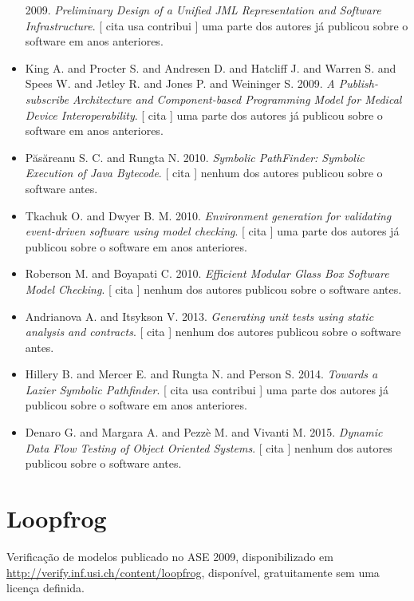 \begin{itemize}
      2009.
        \textit{ Preliminary Design of a Unified JML Representation and Software Infrastructure}.
      [
          cita
          usa
          contribui
      ]
uma parte dos autores já publicou sobre o software em anos anteriores.
\item King A. and Procter S. and Andresen D. and Hatcliff J. and Warren S. and Spees W. and Jetley R. and Jones P. and Weininger S.
      2009.
        \textit{ A Publish-subscribe Architecture and Component-based Programming Model for Medical Device Interoperability}.
      [
          cita
      ]
uma parte dos autores já publicou sobre o software em anos anteriores.
\item P\u{a}s\u{a}reanu S. C. and Rungta N.
      2010.
        \textit{ Symbolic PathFinder: Symbolic Execution of Java Bytecode}.
      [
          cita
      ]
nenhum dos autores publicou sobre o software antes.
\item Tkachuk O. and Dwyer B. M.
      2010.
        \textit{ Environment generation for validating event-driven software using model checking}.
      [
          cita
      ]
uma parte dos autores já publicou sobre o software em anos anteriores.
\item Roberson M. and Boyapati C.
      2010.
        \textit{ Efficient Modular Glass Box Software Model Checking}.
      [
          cita
      ]
nenhum dos autores publicou sobre o software antes.
\item Andrianova A. and Itsykson V.
      2013.
        \textit{ Generating unit tests using static analysis and contracts}.
      [
          cita
      ]
nenhum dos autores publicou sobre o software antes.
\item Hillery B. and Mercer E. and Rungta N. and Person S.
      2014.
        \textit{ Towards a Lazier Symbolic Pathfinder}.
      [
          cita
          usa
          contribui
      ]
uma parte dos autores já publicou sobre o software em anos anteriores.
\item Denaro G. and Margara A. and Pezzè M. and Vivanti M.
      2015.
        \textit{ Dynamic Data Flow Testing of Object Oriented Systems}.
      [
          cita
      ]
nenhum dos autores publicou sobre o software antes.
\end{itemize}
\section{Loopfrog}

Verificação de modelos
publicado no ASE 2009,
disponibilizado em \url{http://verify.inf.usi.ch/content/loopfrog},
disponível,
gratuitamente
sem uma licença definida.

